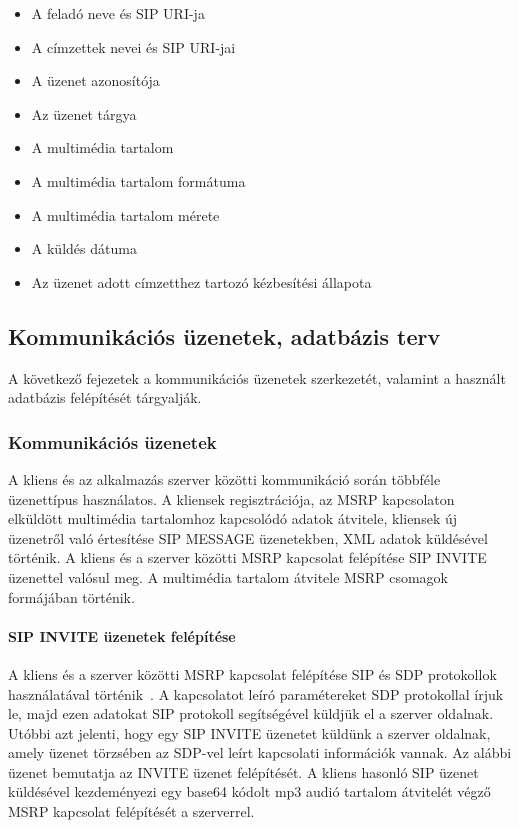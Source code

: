 \begin{itemize}\itemsep1pt
\item	A feladó neve és SIP URI-ja
\item A címzettek nevei és SIP URI-jai
\item A üzenet azonosítója
\item Az üzenet tárgya
\item A multimédia tartalom
\item A multimédia tartalom formátuma
\item A multimédia tartalom mérete
\item A küldés dátuma
\item Az üzenet adott címzetthez tartozó kézbesítési állapota
\end{itemize}


\subsection{Kommunikációs üzenetek, adatbázis terv}

A következő fejezetek a kommunikációs üzenetek szerkezetét, valamint a használt adatbázis felépítését tárgyalják.

\subsubsection{Kommunikációs üzenetek}
\label{sec:komm_uzenetek}

A kliens és az alkalmazás szerver közötti kommunikáció során többféle üzenettípus használatos. A kliensek regisztrációja, az MSRP kapcsolaton elküldött multimédia tartalomhoz kapcsolódó adatok átvitele, kliensek új üzenetről való értesítése SIP MESSAGE üzenetekben, XML adatok küldésével történik. A kliens és a szerver közötti MSRP kapcsolat felépítése SIP INVITE üzenettel valósul meg. A multimédia tartalom átvitele MSRP csomagok formájában történik. 

\paragraph{SIP INVITE üzenetek felépítése\\}
\label{sec:sip_invite}

A kliens és a szerver közötti MSRP kapcsolat felépítése SIP és SDP protokollok használatával történik~\cite{rfc4975}. A kapcsolatot leíró paramétereket SDP protokollal írjuk le, majd ezen adatokat SIP protokoll segítségével küldjük el a szerver oldalnak. Utóbbi azt jelenti, hogy egy SIP INVITE üzenetet küldünk a szerver oldalnak, amely üzenet törzsében az SDP-vel leírt kapcsolati információk vannak. Az alábbi üzenet bemutatja az INVITE üzenet felépítését. A kliens hasonló SIP üzenet küldésével kezdeményezi egy base64 kódolt mp3 audió tartalom átvitelét végző MSRP kapcsolat felépítését a szerverrel.

